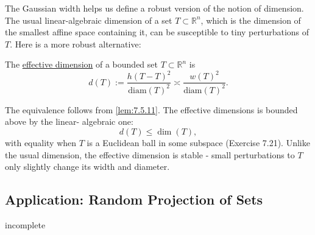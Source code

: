 The Gaussian width helps us define a robust version of the notion of dimension. The usual linear-algebraic 
dimension of a set $T \subset \mathbb{R}^n$, which is the dimension of the smallest affine space containing it, 
can be susceptible to tiny perturbations of $T$. Here is a more robust alternative: 

\begin{definition}[]
\label{def:7.5.12}
The \underline{effective dimension} of a bounded set $T \subset \mathbb{R}^n$ is 
\[ d(T) := \frac{h(T - T)^2}{\mathrm{diam}(T)^2} \asymp \frac{w(T)^2}{\mathrm{diam}(T)^2}. \]
\end{definition}

The equivalence follows from \cref{lem:7.5.11}. The effective dimensions is bounded above by the linear-
algebraic one: 
\[ d(T) \leq \dim{(T)}, \]
with equality when $T$ is a Euclidean ball in some subspace (Exercise 7.21). Unlike the usual dimension, the 
effective dimension is stable - small perturbations to $T$ only slightly change its width and diameter.



\subsection{Application: Random Projection of Sets}


\begin{theorem}[]
\label{thm:7.6.1}
incomplete
\end{theorem}
